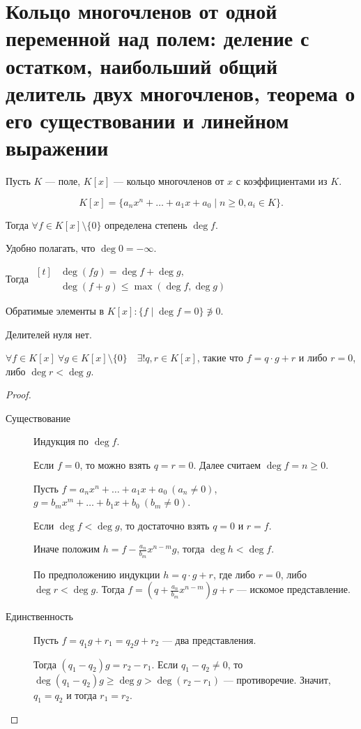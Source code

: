 \section{Кольцо многочленов от одной переменной над полем: деление с остатком, наибольший общий делитель двух многочленов, теорема о его существовании и линейном выражении}

Пусть $K$ --- поле, $K[x]$ --- кольцо многочленов от $x$ с коэффициентами из $K$.

\begin{equation*}
    K[x] = \{a_n x^{n} + \dots + a_1 x + a_0 \mid n \geq 0, a_i \in K\}
.\end{equation*}

Тогда $\forall f \in K[x] \setminus \{0\}$ определена степень $\deg f$.

Удобно полагать, что $\deg 0 = -\infty$.

Тогда
\begin{math}
    \begin{aligned}[t]
        &\deg (fg) = \deg f + \deg g, \\
        &\deg (f + g) \leq \max(\deg f, \deg g)
    \end{aligned}
\end{math}

\medskip
Обратимые элементы в $K[x]: \{f \mid \deg f = 0\} \not\ni 0$.

Делителей нуля нет.

\begin{theorem}
    $\forall f \in K[x] \ \forall g \in K[x] \setminus \{0\} \quad \exists! q, r \in K[x]$, такие что $f = q \cdot g + r$ и либо $r = 0$, либо $\deg r < \deg g$.
\end{theorem}

\begin{proof}~
    \begin{description}
    \item[Существование] 
        Индукция по $\deg f$.

        Если $f = 0$, то можно взять $q = r = 0$. Далее считаем $\deg f = n \geq 0$.

        Пусть $f = a_n x^{n} + \dots + a_1 x + a_0 \ (a_n \neq 0)$, $g = b_m x^{m} + \dots + b_1 x + b_0 \ (b_m \neq 0)$.

        Если $\deg f < \deg g$, то достаточно взять $q = 0$ и $r = f$.

        Иначе положим $h = f - \frac{a_n}{b_m}x^{n - m}g$, тогда $\deg h < \deg f$.

        По предположению индукции $h = q \cdot g + r$, где либо $r = 0$, либо $\deg r < \deg g$. Тогда $f = \left(q + \frac{a_n}{b_m} x^{n - m}\right) g + r$ --- искомое представление.

    \item[Единственность] Пусть $f = q_1 g + r_1 = q_2 g + r_2$ --- два представления.

        Тогда $(q_1 - q_2)g = r_2 - r_1$. Если $q_1 - q_2 \neq 0$, то $\deg (q_1 - q_2)g \geq \deg g > \deg (r_2 - r_1)$ --- противоречие. Значит, $q_1 = q_2$ и тогда $r_1 = r_2$.
        \qedhere
    \end{description}
\end{proof}


